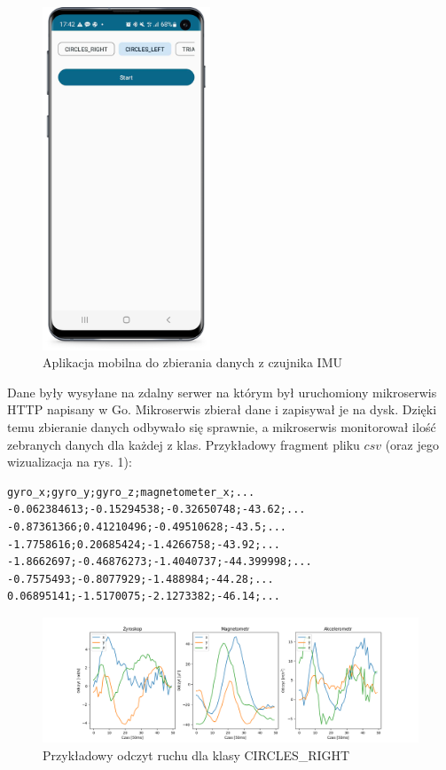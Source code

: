 \documentclass[10pt]{article}
\begin{document}
\begin{figure}[h]
\label{fig:screenshot}
\includegraphics[width=5cm]{s1.png}
\centering
\caption{Aplikacja mobilna do zbierania danych z czujnika IMU}
\end{figure}

Dane były wysyłane na zdalny serwer na którym był uruchomiony mikroserwis HTTP napisany w Go. Mikroserwis zbierał dane i zapisywał je na dysk. Dzięki temu zbieranie danych odbywało się sprawnie, a mikroserwis monitorował ilość zebranych danych dla każdej z klas. Przykładowy fragment pliku $csv$ (oraz jego wizualizacja na rys. 1):

\begin{verbatim}  
gyro_x;gyro_y;gyro_z;magnetometer_x;...
-0.062384613;-0.15294538;-0.32650748;-43.62;...
-0.87361366;0.41210496;-0.49510628;-43.5;...
-1.7758616;0.20685424;-1.4266758;-43.92;...
-1.8662697;-0.46876273;-1.4040737;-44.399998;...
-0.7575493;-0.8077929;-1.488984;-44.28;...
0.06895141;-1.5170075;-2.1273382;-46.14;...
\end{verbatim}


\begin{figure}[H]
  \includegraphics[width=16cm]{sample.png}
  \centering
  \caption{Przykładowy odczyt ruchu dla klasy CIRCLES\_RIGHT}
\end{figure}
\end{document}
